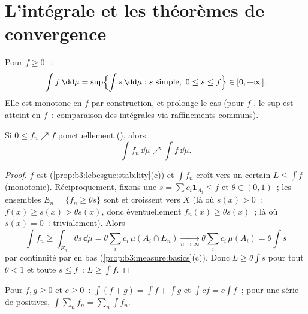 \section{L'intégrale et les théorèmes de convergence}

\begin{definition}\label{def:b3:lebesgue:integral}
Pour $f \geq 0$ ~:
\[
\int f \,\dd\mu = \sup\Bigl\{\int s\,\dd\mu : s \text{
simple},\ 0 \leq s \leq f\Bigr\} \in [0, +\infty].
\]
Elle est monotone en $f$ par construction, et prolonge le cas
 (pour $f$ , le sup est atteint en $f$~:
comparaison des intégrales  via raffinements
communs).
\end{definition}

\begin{theorem}
\label{thm:b3:lebesgue:mct}
Si $0 \leq f_n \nearrow f$ ponctuellement (),
alors
\[
\int f_n\,\dd\mu \nearrow \int f\,\dd\mu .
\]
\end{theorem}

\begin{proof}
$f$ est  (\cref{prop:b3:lebesgue:stability}(c)) et
$\int f_n$ croît vers un certain $L \leq \int f$
(monotonie). Réciproquement, fixons une  $s = \sum
c_i\mathbf 1_{A_i} \leq f$ et $\theta \in (0,1)$~; les
ensembles $E_n = \{f_n \geq \theta s\}$ sont  et
croissent vers $X$ (là où $s(x) > 0$~: $f(x) \geq s(x) >
\theta s(x)$, donc éventuellement $f_n(x) \geq \theta
s(x)$~; là où $s(x) = 0$~: trivialement). Alors
\[
\int f_n \geq \int_{E_n}\theta s\,\dd\mu
= \theta\sum_i c_i\,\mu(A_i \cap E_n)
\xrightarrow[n\to\infty]{} \theta\sum_ic_i\,\mu(A_i)
= \theta\int s
\]
par continuité par en bas (\cref{prop:b3:measure:basics}(c)).
Donc $L \geq \theta\int s$ pour tout $\theta < 1$ et toute
 $s \leq f$~: $L \geq \int f$.
\end{proof}

\begin{corollary}\label{cor:b3:lebesgue:additivity}
Pour $f, g \geq 0$  et $c \geq 0$~: $\int(f + g)
= \int f + \int g$ et $\int cf = c\int f$~; pour une série
de  positives, $\int\sum_nf_n =
\sum_n\int f_n$.
\end{corollary}

